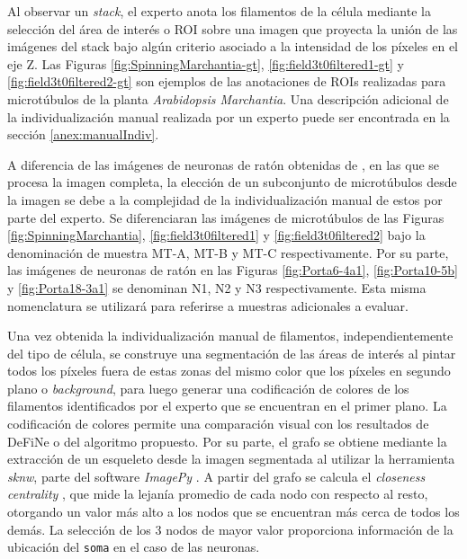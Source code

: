 Al observar un {\it stack}, el experto anota los filamentos de la c\'elula mediante la selecci\'on del \'area de inter\'es o ROI sobre una imagen que proyecta la uni\'on de las im\'agenes del stack bajo alg\'un criterio asociado a la intensidad de los p\'ixeles en el eje Z. Las Figuras \ref{fig:SpinningMarchantia-gt}, \ref{fig:field3t0filtered1-gt} y \ref{fig:field3t0filtered2-gt} son ejemplos de las anotaciones de ROIs realizadas para microt\'ubulos de la planta {\it Arabidopsis Marchantia}. Una descripci\'on adicional de la individualizaci\'on manual realizada por un experto puede ser encontrada en la secci\'on \ref{anex:manualIndiv}.


A diferencia de las im\'agenes de neuronas de rat\'on obtenidas de \citet{ampuero2019chronic}, en las que se procesa la imagen completa, la elecci\'on de un subconjunto de microt\'ubulos desde la imagen se debe a la complejidad de la individualizaci\'on manual de estos por parte del experto. Se diferenciaran las im\'agenes de microt\'ubulos de las Figuras \ref{fig:SpinningMarchantia}, \ref{fig:field3t0filtered1} y \ref{fig:field3t0filtered2} bajo la denominaci\'on de muestra MT-A, MT-B y MT-C respectivamente. Por su parte, las im\'agenes de neuronas de rat\'on en las Figuras \ref{fig:Porta6-4a1}, \ref{fig:Porta10-5b} y \ref{fig:Porta18-3a1}  se denominan N1, N2 y N3 respectivamente. Esta misma nomenclatura se utilizar\'a para referirse a muestras adicionales a evaluar.


Una vez obtenida la individualizaci\'on manual de filamentos, independientemente del tipo de c\'elula, se construye una segmentaci\'on de las \'areas de inter\'es al pintar todos los p\'ixeles fuera de estas zonas del mismo color que los p\'ixeles en segundo plano o {\it background}, para luego  generar una codificaci\'on de colores de los filamentos identificados por el experto que se encuentran en el primer plano. La codificaci\'on de colores permite una comparaci\'on visual con los resultados de DeFiNe o del algoritmo propuesto. Por su parte, el grafo se obtiene mediante la extracci\'on de un esqueleto desde la imagen segmentada al utilizar la herramienta {\it sknw}, parte del software {\it ImagePy} . A partir del grafo se calcula el {\it closeness centrality} , que mide la lejan\'ia promedio de cada nodo con respecto al resto, otorgando un valor m\'as alto a los nodos que se encuentran m\'as cerca de todos los dem\'as. La selecci\'on de los 3 nodos de mayor valor proporciona informaci\'on de la ubicaci\'on del {\tt soma} en el caso de las neuronas.


